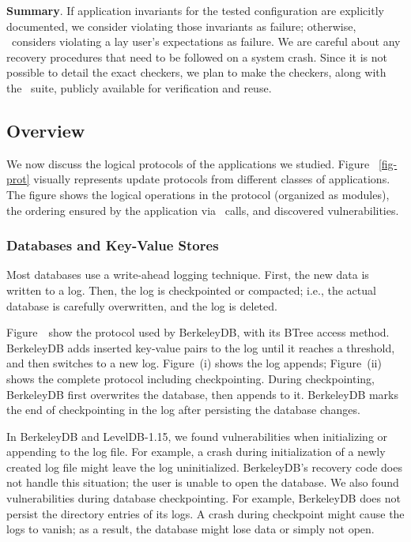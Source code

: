 \textbf{Summary}. If application invariants for the tested configuration are
explicitly documented, we consider violating those invariants as failure;
otherwise, \toolname\ considers violating a lay user's expectations as failure.
We are careful about any recovery procedures that need to be followed on a
system crash.  Since it is not possible to detail the exact checkers, we plan
to make the checkers, along with the \toolname\ suite, publicly available for
verification and reuse.

\subsection{Overview}
\label{sec-case}



We now discuss the logical protocols of the applications we studied. Figure
~\ref{fig-prot} visually represents update protocols from different classes of
applications. The figure shows the logical operations in the protocol
(organized as modules), the ordering ensured by the application via \fsyncSC\
calls, and discovered vulnerabilities.

\subsubsection{Databases and Key-Value Stores}

Most databases use a write-ahead logging technique.  First, the new data is
written to a log. Then, the log is checkpointed or compacted; i.e., the actual
database is carefully overwritten, and the log is deleted.

Figure~\ show the protocol used by BerkeleyDB, with its BTree
access method. BerkeleyDB adds inserted key-value pairs to the log until it
reaches a threshold, and then switches to a new log.
Figure~(i) shows the log appends; Figure~(ii)
shows the complete protocol including checkpointing. During checkpointing,
BerkeleyDB first overwrites the database, then appends to it.
BerkeleyDB marks the end of checkpointing in the log after persisting the
database changes.

In BerkeleyDB and LevelDB-1.15, we found vulnerabilities when initializing or
appending to the log file. For example, a crash during initialization of a
newly created log file might leave the log uninitialized. BerkeleyDB's recovery
code does not handle this situation; the user is unable to open the
database. We also found vulnerabilities during database 
checkpointing. For example, BerkeleyDB does not persist the directory entries of
its logs. A crash during checkpoint might cause the logs to vanish; as a
result, the database might lose data or simply not open.

